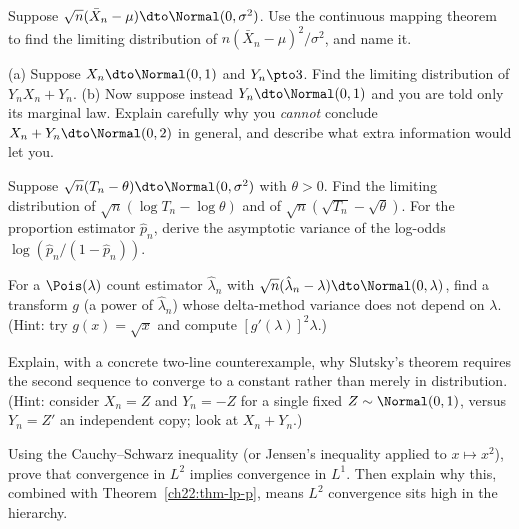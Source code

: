 \begin{exercise}
\label{ch22:exr-cmt}
Suppose $\sqrt n(\bar X_n - \mu)\dto\Normal(0,\sigma^2)$. Use the continuous mapping
theorem to find the limiting distribution of $n(\bar X_n - \mu)^2/\sigma^2$, and name
it.
\end{exercise}

\begin{exercise}
\label{ch22:exr-slutsky}
(a) Suppose $X_n\dto\Normal(0,1)$ and $Y_n\pto3$. Find the limiting distribution of
$Y_n X_n + Y_n$. (b) Now suppose instead $Y_n\dto\Normal(0,1)$ and you are told only
its marginal law. Explain carefully why you \emph{cannot} conclude
$X_n + Y_n\dto\Normal(0,2)$ in general, and describe what extra information would let
you.
\end{exercise}

\begin{exercise}
\label{ch22:exr-delta}
Suppose $\sqrt n(T_n-\theta)\dto\Normal(0,\sigma^2)$ with $\theta>0$. Find the
limiting distribution of $\sqrt n(\log T_n - \log\theta)$ and of
$\sqrt n(\sqrt{T_n}-\sqrt\theta)$. For the proportion estimator $\hat p_n$, derive the
asymptotic variance of the log-odds $\log(\hat p_n/(1-\hat p_n))$.
\end{exercise}

\begin{exercise}
\label{ch22:exr-varstab}
For a $\Pois(\lambda)$ count estimator $\hat\lambda_n$ with
$\sqrt n(\hat\lambda_n-\lambda)\dto\Normal(0,\lambda)$, find a transform $g$ (a power
of $\hat\lambda_n$) whose delta-method variance does not depend on $\lambda$. (Hint:
try $g(x)=\sqrt x$ and compute $[g'(\lambda)]^2\lambda$.)
\end{exercise}

\begin{exercise}
\label{ch22:exr-const}
Explain, with a concrete two-line counterexample, why Slutsky's theorem requires the
second sequence to converge to a constant rather than merely in distribution. (Hint:
consider $X_n=Z$ and $Y_n=-Z$ for a single fixed $Z\sim\Normal(0,1)$, versus
$Y_n=Z'$ an independent copy; look at $X_n+Y_n$.)
\end{exercise}

\begin{exercise}
\label{ch22:exr-l2-l1}
Using the Cauchy--Schwarz inequality (or Jensen's inequality applied to $x\mapsto
x^2$), prove that convergence in $L^2$ implies convergence in $L^1$. Then explain why
this, combined with Theorem~\ref{ch22:thm-lp-p}, means $L^2$ convergence sits high in
the hierarchy.
\end{exercise}

